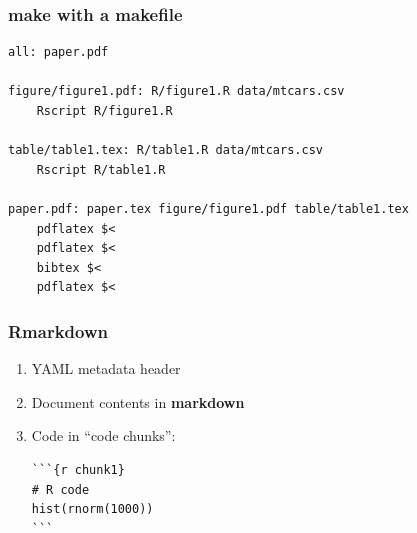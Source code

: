 \documentclass[14pt]{beamer}
\begin{document}



\begin{frame}[fragile]
\frametitle{make with a makefile}

\scriptsize
\begin{verbatim}
all: paper.pdf

figure/figure1.pdf: R/figure1.R data/mtcars.csv
    Rscript R/figure1.R

table/table1.tex: R/table1.R data/mtcars.csv
    Rscript R/table1.R

paper.pdf: paper.tex figure/figure1.pdf table/table1.tex
    pdflatex $<
    pdflatex $<
    bibtex $<
    pdflatex $<
\end{verbatim}
\end{frame}


\frame{}





\begin{frame}[fragile]

\frametitle{Rmarkdown}

\begin{enumerate}\itemsep0.5em
\item YAML metadata header
\item Document contents in \textbf{markdown}
\item Code in ``code chunks'':

\begin{verbatim}
```{r chunk1}
# R code
hist(rnorm(1000))
```
\end{verbatim}
\end{enumerate}

\end{frame}
\end{document}
